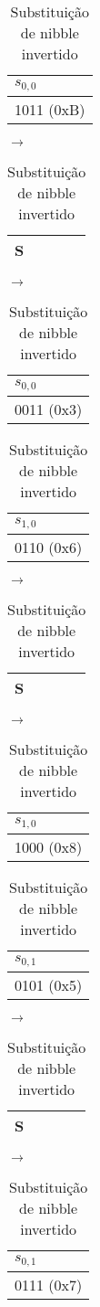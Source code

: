 \documentclass[
    article,            %
    11pt,               %
    oneside,            %
    a4paper,            %
    english,            %
    brazil,             %
    sumario=tradicional,
    ]{abntex2}
\begin{document}
\begin{table}[H]
\centering
\caption{Substituição de nibble invertido}
\label{round2-nibbles-change-inverted}
\begin{tabular}{|l|}
\hline
$s_{0,0}$  \\ \hline
1011 (0xB)       \\ \hline
\end{tabular}
$\longrightarrow$
\begin{tabular}{|l|}
\hline
S  \\ \hline
\end{tabular}
$\longrightarrow$
\begin{tabular}{|l|}
\hline
$s_{0,0}$  \\ \hline
0011 (0x3) \\ \hline
\end{tabular}

\vspace{0.5cm}

\begin{tabular}{|l|}
\hline
$s_{1,0}$  \\ \hline
0110 (0x6)       \\ \hline
\end{tabular}
$\longrightarrow$
\begin{tabular}{|l|}
\hline
S  \\ \hline
\end{tabular}
$\longrightarrow$
\begin{tabular}{|l|}
\hline
$s_{1,0}$  \\ \hline
1000 (0x8)      \\ \hline
\end{tabular}

\vspace{0.5cm}

\begin{tabular}{|l|}
\hline
$s_{0,1}$  \\ \hline
0101 (0x5)       \\ \hline
\end{tabular}
$\longrightarrow$
\begin{tabular}{|l|}
\hline
S  \\ \hline
\end{tabular}
$\longrightarrow$
\begin{tabular}{|l|}
\hline
$s_{0,1}$  \\ \hline
0111 (0x7)      \\ \hline
\end{tabular}

\vspace{0.5cm}


\end{table}
\end{document}
